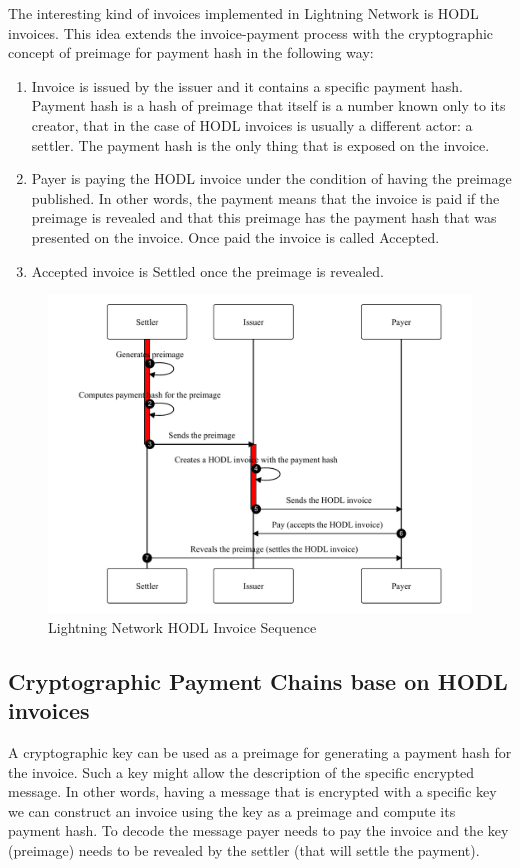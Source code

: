\documentclass{article}
\begin{document}
The interesting kind of invoices implemented in Lightning Network is HODL invoices. This idea extends the invoice-payment process with the cryptographic concept of preimage for payment hash in the following way:
\begin{enumerate}
	\item Invoice is issued by the issuer and it contains a specific payment hash. Payment hash is a hash of preimage that itself is a number known only to its creator, that in the case of HODL invoices is usually a different actor: a settler. The payment hash is the only thing that is exposed on the invoice.
	\item Payer is paying the HODL invoice under the condition of having the preimage published. In other words, the payment means that the invoice is paid if the preimage is revealed and that this preimage has the payment hash that was presented on the invoice. Once paid the invoice is called Accepted.
	\item Accepted invoice is Settled once the preimage is revealed.
\end{enumerate}


\begin{figure}
	\centering
	\includegraphics[scale=0.6]{LNDSequence.pdf}
	\caption{Lightning Network HODL Invoice Sequence}
	\label{fig:fr:lndsequence}
\end{figure}

\subsection{Cryptographic Payment Chains base on HODL invoices}
A cryptographic key can be used as a preimage for generating a payment hash for the invoice. Such a key might allow the description of the specific encrypted message. In other words, having a message that is encrypted with a specific key we can construct an invoice using the key as a preimage and compute its payment hash. To decode the message payer needs to pay the invoice and the key (preimage) needs to be revealed by the settler (that will settle the payment).
\end{document}

